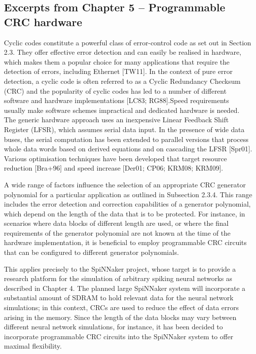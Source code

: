 \documentclass[a4paper, 11pt]{article}
\begin{document}
\newpage
\subsection{Excerpts from Chapter 5 -- Programmable CRC hardware}
Cyclic codes constitute a powerful class of error-control code as set out in Section 2.3. They offer effective error detection and can easily be realised in hardware, which makes them a popular choice for many applications that require the detection of errors, including Ethernet [TW11]. In the context of pure error detection, a cyclic code is often referred to as a Cyclic Redundancy Checksum (CRC) and the popularity of cyclic codes has led to a number of different software and hardware implementations [LC83; RG88].Speed requirements usually make software schemes impractical and dedicated hardware is needed. The generic hardware approach uses an inexpensive Linear Feedback Shift Register (LFSR), which assumes serial data input. In the presence of wide data buses, the serial computation has been extended to parallel versions that process whole data words based on derived equations and on cascading the LFSR [Spr01]. Various optimisation techniques have been developed that target resource reduction [Bra+96] and speed increase [Der01; CP06; KRM08; KRM09].

A wide range of factors influence the selection of an appropriate CRC generator polynomial for a particular application as outlined in Subsection 2.3.4. This range includes the error detection and correction capabilities of a generator polynomial, which depend on the length of the data that is to be protected. For instance, in scenarios where data blocks of different length are used, or where the final requirements of the generator polynomial are not known at the time of the hardware implementation, it is beneficial to employ programmable CRC circuits that can be configured to different generator polynomials.

This applies precisely to the SpiNNaker project, whose target is to provide a research platform for the simulation of arbitrary spiking neural networks as described in Chapter 4. The planned large SpiNNaker system will incorporate a substantial amount of SDRAM to hold relevant data for the neural network simulations; in this context, CRCs are used to reduce the effect of data errors arising in the memory. Since the length of the data blocks may vary between different neural network simulations, for instance, it has been decided to incorporate programmable CRC circuits into the SpiNNaker system to offer maximal flexibility.
\end{document}
